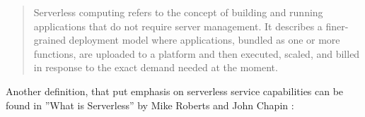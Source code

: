 \begin{quotation}
    \noindent Serverless computing refers to the concept of building and running applications that do not require server management. It describes a finer-grained deployment model where applications, bundled as one or more functions, are uploaded to a platform and then executed, scaled, and billed in response to the exact demand needed at the moment.
\end{quotation}





Another definition, that put emphasis on serverless service capabilities can be found in ''What is Serverless'' by Mike Roberts and John Chapin \cite{RobertsChapin2017}:

